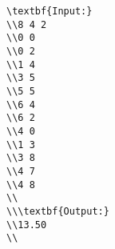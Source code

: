 \begin{verbatim}
\textbf{Input:}
\\8 4 2
\\0 0
\\0 2
\\1 4
\\3 5
\\5 5
\\6 4
\\6 2
\\4 0
\\1 3
\\3 8
\\4 7
\\4 8
\\
\\\textbf{Output:}
\\13.50
\\\end{verbatim}